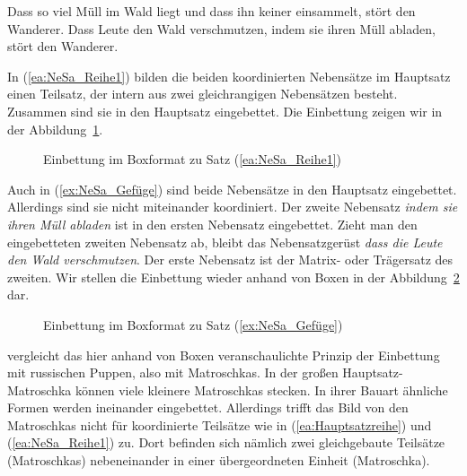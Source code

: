 \ea 
\ea \label{ea:NeSa_Reihe1} Dass so viel Müll im Wald liegt und dass ihn keiner einsammelt, stört den Wanderer.
\ex \label{ex:NeSa_Gefüge} Dass Leute den Wald verschmutzen, indem sie ihren Müll abladen, stört den Wanderer.
\z 
\z 

In (\ref{ea:NeSa_Reihe1}) bilden die beiden koordinierten Nebensätze im Hauptsatz einen Teilsatz, der intern aus zwei gleichrangigen Nebensätzen besteht. Zusammen sind sie in den Hauptsatz eingebettet. Die Einbettung zeigen wir in der Abbildung~\ref{fig:NeSaKONJNeSa}.

\begin{figure}
\caption{\label{fig:NeSaKONJNeSa} Einbettung im Boxformat zu Satz (\ref{ea:NeSa_Reihe1})}
\end{figure}%


Auch in (\ref{ex:NeSa_Gefüge}) sind beide Nebensätze in den Hauptsatz eingebettet. Allerdings sind sie nicht miteinander koordiniert. Der zweite Nebensatz \textit{indem sie ihren Müll abladen} ist in den ersten Nebensatz eingebettet. Zieht man den eingebetteten zweiten Nebensatz ab, bleibt das Nebensatzgerüst \textit{dass die Leute den Wald verschmutzen}. Der erste Nebensatz ist der Matrix- oder Trägersatz des zweiten. Wir stellen die Einbettung wieder anhand von Boxen in der Abbildung~\ref{fig:NeSainNeSa} dar.

\begin{figure}
\caption{\label{fig:NeSainNeSa} Einbettung im Boxformat zu Satz (\ref{ex:NeSa_Gefüge})}
\end{figure}%

\citet[462]{Fabricius_Hansen_1992} vergleicht das hier anhand von Boxen veranschaulichte Prinzip der Einbettung mit russischen Puppen, also mit Matroschkas. In der großen Hauptsatz-Matroschka können viele kleinere Matroschkas stecken. In ihrer Bauart ähnliche Formen werden ineinander eingebettet. Allerdings trifft das Bild von den Matroschkas nicht für koordinierte Teilsätze wie in (\ref{ea:Hauptsatzreihe}) und (\ref{ea:NeSa_Reihe1}) zu. Dort befinden sich nämlich zwei gleichgebaute Teilsätze (Matroschkas) nebeneinander in einer übergeordneten Einheit (Matroschka).

